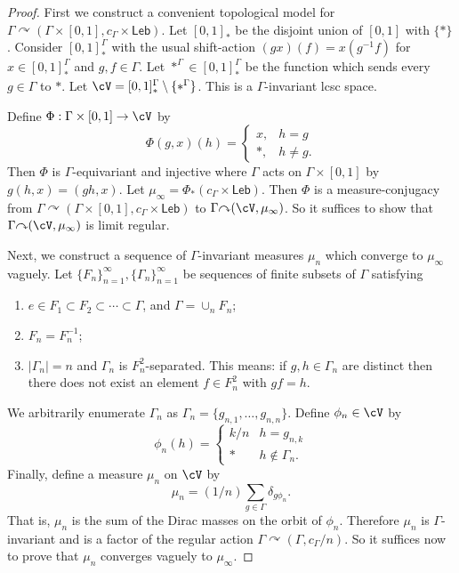 \documentclass[12pt]{article}
\theoremstyle{plain}
\theoremstyle{definition}
\theoremstyle{remark}
\newcommand{\G}{\Gamma}
\renewcommand\d{\delta}
\def\cc{{\curvearrowright}}
\begin{document}
\begin{proof}
First we construct a convenient topological model for $\G \cc (\G\times [0,1],c_\G\times \mathsf{Leb})$. Let $[0,1]_*$ be the disjoint union of $[0,1]$ with $\{*\}$. Consider $[0,1]_*^\G$ with the usual shift-action $(gx)(f)=x(g^{-1}f)$ for $x\in [0,1]_*^\G$ and $g,f \in \G$. Let $*^\G \in [0,1]_*^\G$ be the function which sends every $g\in \G$ to $*$. Let $\cV=[0,1]_*^\G\setminus \{*^\G\}$. This is a $\G$-invariant lcsc space. 

Define $\Phi:\G\times [0,1] \to \cV$ by 
\begin{displaymath}
    \Phi(g,x)(h) =
    \begin{cases}
        x, & h=g \\
        *, & h \ne g.
    \end{cases}
\end{displaymath}
Then $\Phi$ is $\G$-equivariant and injective where $\G$ acts on $\G\times [0,1]$ by $g(h,x)=(gh,x)$. Let $\mu_\infty = \Phi_*(c_\G \times \mathsf{Leb})$. Then $\Phi$ is a measure-conjugacy from $\G \cc (\G\times [0,1],c_\G\times \mathsf{Leb})$ to $\G \cc (\cV,\mu_\infty)$. So it suffices to show that $\G \cc (\cV,\mu_\infty)$ is limit regular.

Next, we construct a sequence of $\G$-invariant measures $\mu_n$ which converge to $\mu_\infty$ vaguely. Let $\{F_n\}_{n=1}^\infty, \{\G_n\}_{n=1}^\infty$ be sequences of finite subsets of $\G$ satisfying
\begin{enumerate}
    \item $e\in F_1\subset F_2\subset \cdots \subset \G$, and $\G  = \cup_n F_n$;
    \item $F_n=F_n^{-1}$;
    \item $|\G_n|=n$ and $\G_n$ is $F_n^2$-separated. This means: if $g,h \in \G_n$ are distinct then there does not exist an element $f\in F_n^2$ with $gf=h$. 
\end{enumerate}
We arbitrarily enumerate $\G_n$ as $\G_n=\{g_{n,1},\ldots, g_{n,n}\}$. Define $\phi_n \in \cV$ by
\begin{displaymath}
    \phi_n(h) =
    \begin{cases}
        k/n & h=g_{n,k} \\
        * & h \notin \G_n.
    \end{cases}
\end{displaymath}
Finally, define a measure $\mu_n$ on $\cV$ by
$$\mu_n = (1/n)\sum_{g\in \G} \d_{g\phi_n}.$$
That is, $\mu_n$ is the sum of the Dirac masses on the orbit of $\phi_n$. Therefore $\mu_n$ is $\G$-invariant and is a factor of the regular action $\G \cc (\G, c_\G/n)$. So it suffices now to prove that $\mu_n$ converges vaguely to $\mu_\infty$.


\end{proof}
\end{document}

